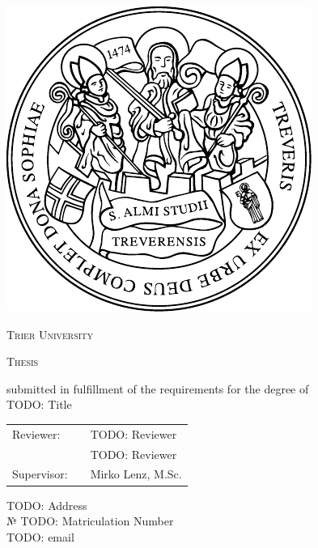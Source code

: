 
\makeatletter

\begin{titlepage}
    \centering

    \includegraphics[width=0.2\linewidth]{assets/logo}

    {\huge\scshape Trier University\par}
    \vfill


    {\huge\sffamily\bfseries \@title\par}
    \vfill

    {\huge\scshape Thesis\par}
    \vspace{1ex}

    submitted in fulfillment of the requirements for the degree of\\
    TODO: Title\par
    \vfill


    \begin{tabular}{lcl}
        Reviewer:   & & TODO: Reviewer \\
                    & & TODO: Reviewer \\[.5ex]
        Supervisor: & & Mirko Lenz, M.Sc.        \\
    \end{tabular}
    \vfill

    {\Large\itshape \@author\par} %
    \vspace{.5ex}

    TODO: Address\\
    № TODO: Matriculation Number\\
    TODO: email\\
    \vfill

    {\Large \@date\par}
\end{titlepage}

\makeatother

